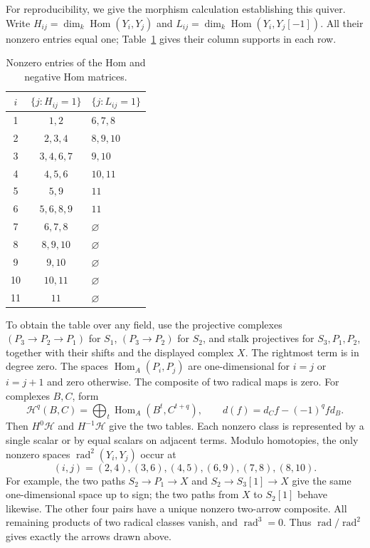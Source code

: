 \documentclass[pdflatex,sn-mathphys-num]{sn-jnl}
\numberwithin{equation}{section}
\theoremstyle{definition}
\theoremstyle{remark}\newtheorem{remark}[theorem]{Remark}
\newcommand{\Hom}{\operatorname{Hom}}
\newcommand{\rad}{\operatorname{rad}}
\newcommand{\dimk}{\dim_k}
\begin{document}
For reproducibility, we give the morphism calculation establishing this
quiver. Write $H_{ij}=\dimk\Hom(Y_i,Y_j)$ and
$L_{ij}=\dimk\Hom(Y_i,Y_j[-1])$. All their nonzero entries equal one;
Table~\ref{tab:hom} gives their column supports in each row.
\par
\begin{table}[htbp]
\centering
\caption{Nonzero entries of the Hom and negative Hom matrices.}\label{tab:hom}
\begin{tabular}{ccl}
\toprule
$i$ & $\{j:H_{ij}=1\}$ & $\{j:L_{ij}=1\}$\\
\midrule
1 & $1,2$ & $6,7,8$\\
2 & $2,3,4$ & $8,9,10$\\
3 & $3,4,6,7$ & $9,10$\\
4 & $4,5,6$ & $10,11$\\
5 & $5,9$ & $11$\\
6 & $5,6,8,9$ & $11$\\
7 & $6,7,8$ & $\varnothing$\\
8 & $8,9,10$ & $\varnothing$\\
9 & $9,10$ & $\varnothing$\\
10 & $10,11$ & $\varnothing$\\
11 & $11$ & $\varnothing$\\
\bottomrule
\end{tabular}
\end{table}
\par
To obtain the table over any field, use the projective complexes
$(P_3\to P_2\to P_1)$ for $S_1$, $(P_3\to P_2)$ for $S_2$,
and stalk projectives for $S_3,P_1,P_2$, together with their shifts and
the displayed complex $X$. The rightmost term is in degree zero.
The spaces $\Hom_A(P_i,P_j)$ are one-dimensional for $i=j$ or $i=j+1$
and zero otherwise. The composite of two radical maps is zero.
For complexes $B,C$, form
\[
 \mathcal H^q(B,C)=\bigoplus_t\Hom_A(B^t,C^{t+q}),\qquad
 d(f)=d_Cf-(-1)^q f d_B.
\]
Then $H^0\mathcal H$ and $H^{-1}\mathcal H$ give the two tables.
Each nonzero class is represented by a single scalar or by equal scalars
on adjacent terms. Modulo homotopies, the only nonzero spaces
$\rad^2(Y_i,Y_j)$ occur at
\[
 (i,j)=(2,4),(3,6),(4,5),(6,9),(7,8),(8,10).
\]
For example, the two paths $S_2\to P_1\to X$ and
$S_2\to S_3[1]\to X$ give the same one-dimensional space up to sign;
the two paths from $X$ to $S_2[1]$ behave likewise. The other four pairs
have a unique nonzero two-arrow composite. All remaining products of
two radical classes vanish, and $\rad^3=0$.
Thus $\rad/\rad^2$ gives exactly the arrows drawn above.
\end{document}
